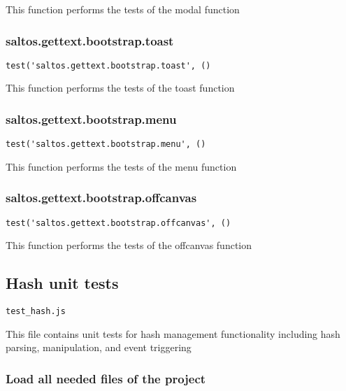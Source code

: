 \documentclass[a4paper]{article}
\begin{document}
This function performs the tests of the modal function

\hypertarget{toc186}{}
\subsubsection{saltos.gettext.bootstrap.toast}

\begin{lstlisting}
test('saltos.gettext.bootstrap.toast', ()
\end{lstlisting}

This function performs the tests of the toast function

\hypertarget{toc187}{}
\subsubsection{saltos.gettext.bootstrap.menu}

\begin{lstlisting}
test('saltos.gettext.bootstrap.menu', ()
\end{lstlisting}

This function performs the tests of the menu function

\hypertarget{toc188}{}
\subsubsection{saltos.gettext.bootstrap.offcanvas}

\begin{lstlisting}
test('saltos.gettext.bootstrap.offcanvas', ()
\end{lstlisting}

This function performs the tests of the offcanvas function

\hypertarget{toc189}{}
\subsection{Hash unit tests}

\begin{lstlisting}
test_hash.js
\end{lstlisting}

This file contains unit tests for hash management functionality
including hash parsing, manipulation, and event triggering

\hypertarget{toc190}{}
\subsubsection{Load all needed files of the project}
\end{document}
